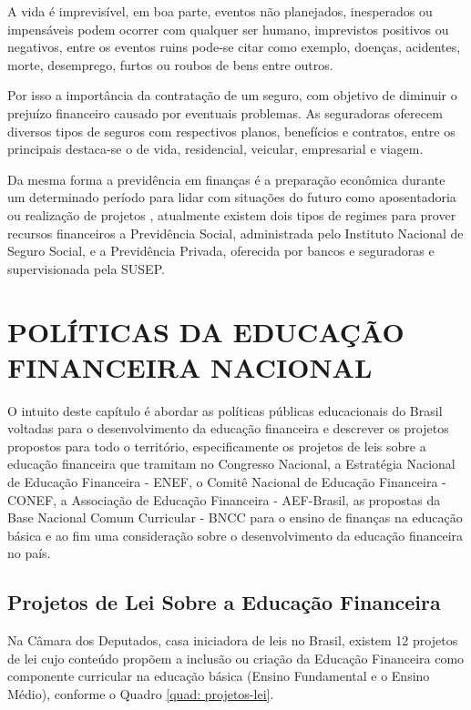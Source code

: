A vida é imprevisível, em boa parte, eventos não planejados, inesperados ou impensáveis podem ocorrer com qualquer ser humano, imprevistos positivos ou negativos, entre os eventos ruins pode-se citar como exemplo, doenças, acidentes, morte, desemprego, furtos ou roubos de bens entre outros.

Por isso a importância da contratação de um seguro, com objetivo de diminuir o prejuízo financeiro causado por eventuais problemas. As seguradoras oferecem diversos tipos de seguros com respectivos planos, benefícios e contratos, entre os principais destaca-se o de vida, residencial, veicular, empresarial e viagem.

Da mesma forma a previdência em finanças é a preparação econômica durante um determinado período para lidar com situações do futuro como aposentadoria ou realização de projetos \cite{bb2015}, atualmente existem dois tipos de regimes para prover recursos financeiros a Previdência Social, administrada pelo Instituto Nacional de Seguro Social, e a Previdência Privada, oferecida por bancos e seguradoras e supervisionada pela SUSEP.

\section{POLÍTICAS DA EDUCAÇÃO FINANCEIRA NACIONAL}
O intuito deste capítulo é abordar as políticas públicas educacionais do Brasil voltadas para o desenvolvimento da educação financeira e descrever os projetos propostos para todo o território, especificamente os projetos de leis sobre a educação financeira que tramitam no Congresso Nacional, a Estratégia Nacional de Educação Financeira - ENEF, o Comitê Nacional de Educação Financeira - CONEF, a Associação de Educação Financeira - AEF-Brasil, as propostas da Base Nacional Comum Curricular - BNCC para o ensino de finanças na educação básica e ao fim uma consideração sobre o desenvolvimento da educação financeira no país.

\subsection{Projetos de Lei Sobre a Educação Financeira}
Na Câmara dos Deputados, casa iniciadora de leis no Brasil, existem 12 projetos de lei cujo conteúdo propõem a inclusão ou criação da Educação Financeira como componente curricular na educação básica (Ensino Fundamental e o Ensino Médio), conforme o Quadro \ref{quad: projetos-lei}.


